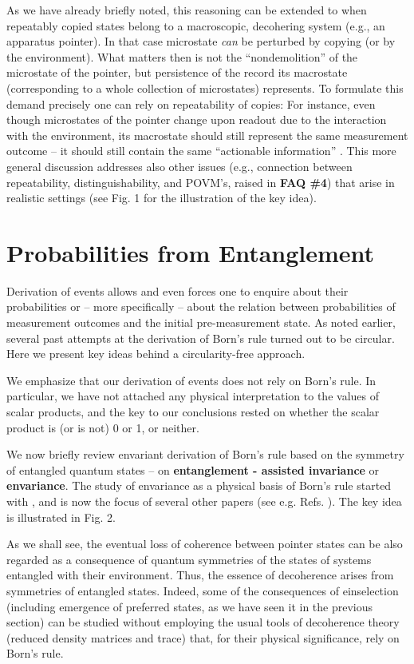 \documentclass[aps,amsmath,amssymb,amsfonts,12pt]{revtex4-1}
\newcommand{\+}         {\dagger}
\begin{document}
{As we have already briefly noted, this reasoning can be extended \cite{Z2013} to when repeatably copied states belong to a macroscopic, decohering system (e.g., an apparatus pointer). In that case microstate {\it can} be perturbed by copying (or by the environment). What matters then is not the ``nondemolition'' of the microstate of the pointer, but persistence of the record its macrostate (corresponding to a whole collection of microstates) represents. To formulate this demand precisely one can rely on repeatability of copies: For instance, even though microstates of the pointer change upon readout due to the interaction with the environment, its macrostate should still represent the same measurement outcome -- it should still contain the same ``actionable information'' \cite{Z2013}. This more general discussion addresses also other issues (e.g., connection between repeatability, distinguishability, and POVM's, raised in {\bf FAQ \#4}) that arise in realistic settings (see Fig. 1 for the illustration of the key idea). 



\section{Probabilities from Entanglement}

Derivation of events allows and even forces one to enquire about their probabilities or -- more specifically -- about the relation 
between probabilities of measurement outcomes and the initial pre-measurement state. 
As noted earlier, several past attempts at the derivation of Born's rule turned out
to be circular. Here we present key ideas behind a circularity-free approach. 


We emphasize that our derivation of events does not rely on Born's rule. In particular, we have not attached any physical interpretation to the values of scalar products, and the key to our conclusions rested on whether the scalar product is (or is not) 0 or 1, or neither.

We now briefly review envariant derivation of Born's rule based on the symmetry of
entangled quantum states -- on {\bf entanglement - assisted invariance} or {\bf envariance}.
The study of envariance as a physical basis of Born's rule started with \cite{76,78,75}, and is now the focus of
several other papers (see e.g. Refs. \cite{53,5,H}). The key idea is illustrated in Fig. 2.

As we shall see, the eventual loss of coherence between pointer states
can be also regarded as a consequence of quantum symmetries of the states of systems entangled
with their environment. Thus, the essence of decoherence arises from symmetries of entangled states.
Indeed, some of the consequences of einselection  (including emergence of preferred states, as we have seen it in the previous section) can be studied without
employing the usual tools of decoherence theory (reduced density matrices and trace) that, for their physical significance, rely on Born's rule.

}
\end{document}
